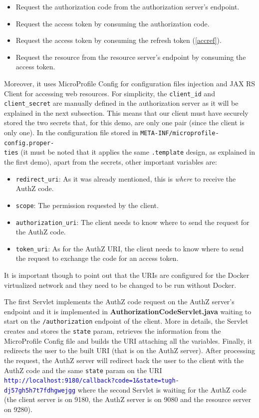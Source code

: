 \begin{itemize}
    \item Request the authorization code from the authorization server's endpoint.
    \item Request the access token by consuming the authorization code.
    \item Request the access token by consuming the refresh token (\ref{accref}).
    \item Request the resource from the resource server's endpoint by consuming the access token.
\end{itemize}

\noindent Moreover, it uses MicroProfile Config for configuration files injection and JAX RS Client for accessing web resources. For simplicity, the \texttt{client\_id} and \texttt{client\_secret} are manually defined in the authorization server as it will be explained in the next subsection. This means that our client must have securely stored the two secrets that, for this demo, are only one pair (since the client is only one). In the configuration file stored in \texttt{META-INF/microprofile-config.proper-\\ties} (it must be noted that it applies the same \texttt{.template} design, as explained in the first demo), apart from the secrets, other important variables are:

\begin{itemize}
    \item \texttt{redirect\_uri}: As it was already mentioned, this is \textit{where} to receive the AuthZ code.
    \item \texttt{scope}: The permission requested by the client.
    \item \texttt{authorization\_uri}: The client needs to know where to send the request for the AuthZ code.
    \item \texttt{token\_uri}: As for the AuthZ URI, the client needs to know where to send the request to exchange the code for an access token.
\end{itemize}

\noindent It is important though to point out that the URIs are configured for the Docker virtualized network and they need to be changed to be run without Docker.

The first Servlet implements the AuthZ code request on the AuthZ server's endpoint and it is implemented in \textbf{AuthorizationCodeServlet.java} waiting to start on the \texttt{/authorization} endpoint of the client. More in details, the Servlet creates and stores the \texttt{state} param, retrieves the information from the MicroProfile Config file and builds the URI attaching all the variables. Finally, it redirects the user to the built URI (that is on the AuthZ server). After processing the request, the AuthZ server will redirect back the user to the client with the AuthZ code and the same \texttt{state} param on the URI \textcolor{blue}{\texttt{http://localhost:9180/callback?code=1\&state=tugh-\\dj57gh5h7t7fdhgwejgg}} where the second Servlet is waiting for the AuthZ code (the client server is on 9180, the AuthZ server is on 9080 and the resource server on 9280).

